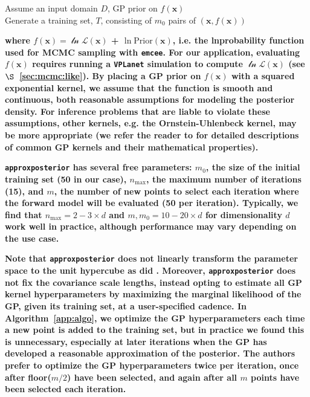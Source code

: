 \documentclass[twocolumn]{aastex62}
\newcommand{\xxx}[1]{{\textbf{#1}}}
\newcommand{\vplanet}[0]{\texttt{VPLanet}\xspace}
\newcommand{\emcee}[0]{\texttt{emcee}\xspace}
\newcommand{\approxposterior}[0]{\texttt{approxposterior}\xspace}
\begin{document}
\begin{algorithm}[H] \label{app:algo}
\SetAlgoLined
 Assume an input domain $D$, GP prior on $f(\textbf{x})$ \\
 Generate a training set, $T$, consisting of $m_0$ pairs of $(\textbf{x}, f(\textbf{x}))$ \\
\caption{\approxposterior Approximate Inference Pseudo Code}
\end{algorithm}
\xxx{where $f(\textbf{x}) = \mathcal{\ln L}(\textbf{x})$ + $\ln \mathrm{Prior}(\textbf{x})$, i.e. the lnprobability function used for MCMC sampling with \emcee. For our application, evaluating $f(\textbf{x})$ requires running a \vplanet simulation to compute $\mathcal{\ln L}(\textbf{x})$ (see $\S$~\ref{sec:mcmc:like}). By placing a GP prior on $f(\textbf{x})$ with a squared exponential kernel, we assume that the function is smooth and continuous, both reasonable assumptions for modeling the posterior density. For inference problems that are liable to violate these assumptions, other kernels, e.g. the Ornstein-Uhlenbeck kernel, may be more appropriate (we refer the reader to \citet{Rasmussen2006} for detailed descriptions of common GP kernels and their mathematical properties).} 

\xxx{\approxposterior has several free parameters: $m_0$, the size of the initial training set (50 in our case), $n_{\mathrm{max}}$, the maximum number of iterations (15), and $m$, the number of new points to select each iteration where the forward model will be evaluated (50 per iteration). Typically, we find that $n_{\mathrm{max}}=2-3 \times d$ and $m, m_0 = 10-20 \times d$ for dimensionality $d$ work well in practice, although performance may vary depending on the use case.}

\xxx{Note that \approxposterior does not linearly transform the parameter space to the unit hypercube as did \citet{Kandasamy2017}. Moreover, \approxposterior does not fix the covariance scale lengths, instead opting to estimate all GP kernel hyperparameters by maximizing the marginal likelihood of the GP, given its training set, at a user-specified cadence. In Algorithm~\ref{app:algo}, we optimize the GP hyperparameters each time a new point is added to the training set, but in practice we found this is unnecessary, especially at later iterations when the GP has developed a reasonable approximation of the posterior. The authors prefer to optimize the GP hyperparameters twice per iteration, once after floor($m/2$) have been selected, and again after all $m$ points have been selected each iteration.}
\end{document}
